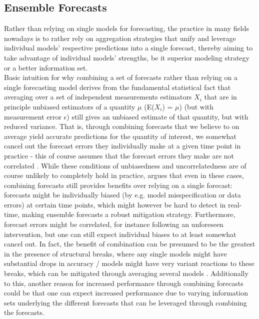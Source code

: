 \subsection{Ensemble Forecasts}
Rather than relying on single models for forecasting, the practice in many fields nowadays is to rather rely on aggregation strategies that unify and leverage individual models' respective predictions into a single forecast, thereby aiming to take advantage of individual models' strengths, be it superior modeling strategy or a better information set.\\
Basic intuition for why combining a set of forecasts rather than relying on a single forecasting model derives from the fundamental statistical fact that averaging over a set of independent measurements estimators $X_i$ that are in principle unbiased estimators of a quantity $\mu$ (E($X_i$) = $\mu$) (but with measurement error $\epsilon$) still gives an unbiased estimate of that quantity, but with reduced variance. That is, through combining forecasts that we believe to on average yield accurate predictions for the quantity of interest, we somewhat cancel out the forecast errors they individually make at a given time point in practice - this of course assumes that the forecast errors they make are not correlated . While these conditions of unbiasedness and uncorrelatedness are of course unlikely to completely hold in practice, \cite{timmermann_chapter_2006} argues that even in these cases, combining forecasts still provides benefits over relying on a single forecast: forecasts might be individually biased (by e.g. model misspecification or data errors) at certain time points, which might however be hard to detect in real-time, making ensemble forecasts a robust mitigation strategy. Furthermore, forecast errors might be correlated, for instance following an unforeseen intervention, but one can still expect individual biases to at least somewhat cancel out. In fact, the benefit of combination can be presumed to be the greatest in the presence of structural breaks, where any single models might have substantial drops in accuracy / models might have very variant reactions to these breaks, which can be mitigated through averaging several models \cite{timmermann_chapter_2006}. Additionally to this, another reason for increased performance through combining forecasts could be that one can expect increased performance due to varying information sets underlying the different forecasts that can be leveraged through combining the forecasts.\\

